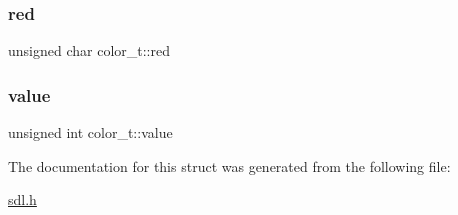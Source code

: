 \subsubsection{\texorpdfstring{red}{red}}
{\footnotesize\ttfamily unsigned char color\+\_\+t\+::red}

\mbox{\label{structcolor__t_ae346ea49d8896a5233739803fdc1671c}} 
\subsubsection{\texorpdfstring{value}{value}}
{\footnotesize\ttfamily unsigned int color\+\_\+t\+::value}



The documentation for this struct was generated from the following file\+:\begin{DoxyCompactItemize}
\item 
\hyperlink{sdl_8h}{sdl.\+h}\end{DoxyCompactItemize}
